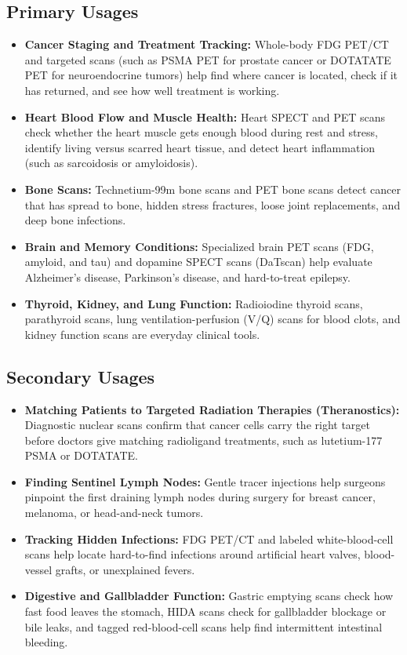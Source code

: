 \subsection{Primary Usages}
\begin{itemize}
  \item \textbf{Cancer Staging and Treatment Tracking:} Whole-body FDG PET/CT and targeted scans (such as PSMA PET for prostate cancer or DOTATATE PET for neuroendocrine tumors) help find where cancer is located, check if it has returned, and see how well treatment is working.
  \item \textbf{Heart Blood Flow and Muscle Health:} Heart SPECT and PET scans check whether the heart muscle gets enough blood during rest and stress, identify living versus scarred heart tissue, and detect heart inflammation (such as sarcoidosis or amyloidosis).
  \item \textbf{Bone Scans:} Technetium-99m bone scans and PET bone scans detect cancer that has spread to bone, hidden stress fractures, loose joint replacements, and deep bone infections.
  \item \textbf{Brain and Memory Conditions:} Specialized brain PET scans (FDG, amyloid, and tau) and dopamine SPECT scans (DaTscan) help evaluate Alzheimer's disease, Parkinson's disease, and hard-to-treat epilepsy.
  \item \textbf{Thyroid, Kidney, and Lung Function:} Radioiodine thyroid scans, parathyroid scans, lung ventilation-perfusion (V/Q) scans for blood clots, and kidney function scans are everyday clinical tools.
\end{itemize}

\subsection{Secondary Usages}
\begin{itemize}
  \item \textbf{Matching Patients to Targeted Radiation Therapies (Theranostics):} Diagnostic nuclear scans confirm that cancer cells carry the right target before doctors give matching radioligand treatments, such as lutetium-177 PSMA or DOTATATE.
  \item \textbf{Finding Sentinel Lymph Nodes:} Gentle tracer injections help surgeons pinpoint the first draining lymph nodes during surgery for breast cancer, melanoma, or head-and-neck tumors.
  \item \textbf{Tracking Hidden Infections:} FDG PET/CT and labeled white-blood-cell scans help locate hard-to-find infections around artificial heart valves, blood-vessel grafts, or unexplained fevers.
  \item \textbf{Digestive and Gallbladder Function:} Gastric emptying scans check how fast food leaves the stomach, HIDA scans check for gallbladder blockage or bile leaks, and tagged red-blood-cell scans help find intermittent intestinal bleeding.
\end{itemize}

